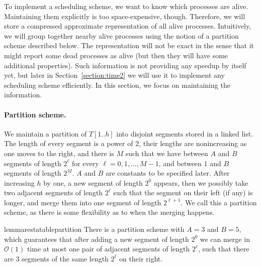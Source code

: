 \documentclass{article}[11pt,letter]
\newcommand{\bigo}{\mathcal{O}}
\newcommand{\head}{h}
\begin{document}
To implement a scheduling scheme, we want to know which processes are alive. Maintaining
them explicitly is too space-expensive, though.
Therefore, we will store a compressed approximate representation of all alive processes.
Intuitively, we will group together nearby alive processes using the notion
of a partition scheme described below. The representation will not be exact
in the sense that it might report some dead processes as alive (but then they will
have some additional properties).
Such information is not providing any speedup by itself yet,
but later in Section~\ref{section:time2} we will use it to implement any scheduling scheme efficiently.
In this section, we focus on maintaining the information.

\paragraph{Partition scheme.} We maintain a partition of $T[1..\head]$ into disjoint segments stored in a linked list.
The length of every segment is a power of $2$, their lengths are nonincreasing as one moves to the right, and there is $M$
such that we
have between $A$ and $B$ segments of length $2^{\ell}$ for every $\ell=0,1,\ldots,M-1$, and between $1$ and $B$ segments of
length $2^{M}$. $A$ and $B$ are constants to be specified later. After increasing $h$ by one, a new segment of
length $2^{0}$ appears, then we possibly take two adjacent segments of length $2^{\ell}$ such that the
segment on their left (if any) is longer, and merge them into one segment of length $2^{\ell+1}$. We call this a partition scheme, as there is some
flexibility as to when the merging happens.

\begin{restatable}{lemma}{restatablepartition}
\label{lemma:partition}
There is a partition scheme with $A=3$ and $B=5$, which guarantees that after adding a new segment of length $2^{0}$ we can
merge in $\bigo(1)$ time at most one pair of adjacent segments of length $2^{\ell}$, such that there are $3$ segments
of the same length $2^{\ell}$ on their right.
\end{restatable}
\end{document}
